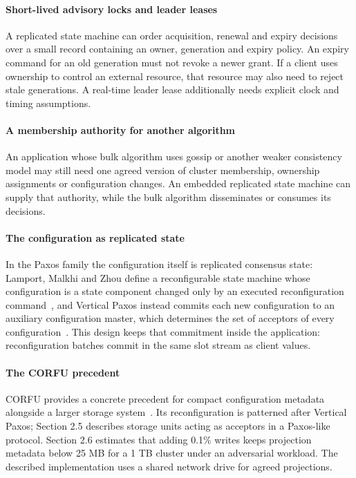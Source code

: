 \documentclass[10pt,journal,letterpaper]{IEEEtran}
\begin{document}
\paragraph{Short-lived advisory locks and leader leases}
A replicated state machine can order acquisition, renewal and expiry decisions over a small record containing an owner, generation and expiry policy. An expiry command for an old generation must not revoke a newer grant. If a client uses ownership to control an external resource, that resource may also need to reject stale generations. A real-time leader lease additionally needs explicit clock and timing assumptions.

\paragraph{A membership authority for another algorithm}
An application whose bulk algorithm uses gossip or another weaker consistency model may still need one agreed version of cluster membership, ownership assignments or configuration changes. An embedded replicated state machine can supply that authority, while the bulk algorithm disseminates or consumes its decisions.

\paragraph{The configuration as replicated state}
In the Paxos family the configuration itself is replicated consensus state: Lamport, Malkhi and Zhou define a reconfigurable state machine whose configuration is a state component changed only by an executed reconfiguration command~\cite{reconfig-sm}, and Vertical Paxos instead commits each new configuration to an auxiliary configuration master, which determines the set of acceptors of every configuration~\cite{vertical-paxos}. This design keeps that commitment inside the application: reconfiguration batches commit in the same slot stream as client values.

\paragraph{The CORFU precedent}
CORFU provides a concrete precedent for compact configuration metadata alongside a larger storage system~\cite{corfu}. Its reconfiguration is patterned after Vertical Paxos; Section 2.5 describes storage units acting as acceptors in a Paxos-like protocol. Section 2.6 estimates that adding 0.1\% writes keeps projection metadata below 25 MB for a 1 TB cluster under an adversarial workload. The described implementation uses a shared network drive for agreed projections.
\end{document}
